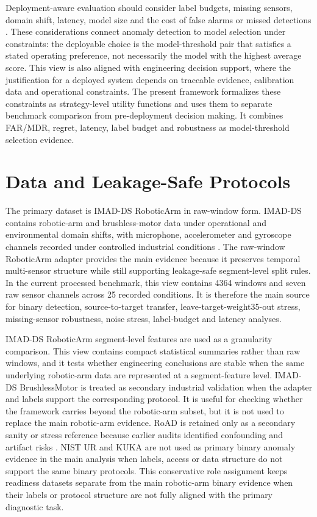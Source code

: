Deployment-aware evaluation should consider label budgets, missing sensors, domain shift, latency, model size and the cost of false alarms or missed detections \cite{Sokolova2009PerformanceMeasures,Elkan2001CostSensitive,Drummond2006CostCurves,Sculley2015TechnicalDebt,Breck2017MLTestScore,Amershi2019SE4ML}. These considerations connect anomaly detection to model selection under constraints: the deployable choice is the model-threshold pair that satisfies a stated operating preference, not necessarily the model with the highest average score. This view is also aligned with engineering decision support, where the justification for a deployed system depends on traceable evidence, calibration data and operational constraints. The present framework formalizes these constraints as strategy-level utility functions and uses them to separate benchmark comparison from pre-deployment decision making. It combines FAR/MDR, regret, latency, label budget and robustness as model-threshold selection evidence.



\section{Data and Leakage-Safe Protocols}



The primary dataset is IMAD-DS RoboticArm in raw-window form. IMAD-DS contains robotic-arm and brushless-motor data under operational and environmental domain shifts, with microphone, accelerometer and gyroscope channels recorded under controlled industrial conditions \cite{Augusti2024IMADDS}. The raw-window RoboticArm adapter provides the main evidence because it preserves temporal multi-sensor structure while still supporting leakage-safe segment-level split rules. In the current processed benchmark, this view contains 4364 windows and seven raw sensor channels across 25 recorded conditions. It is therefore the main source for binary detection, source-to-target transfer, leave-target-weight35-out stress, missing-sensor robustness, noise stress, label-budget and latency analyses.

IMAD-DS RoboticArm segment-level features are used as a granularity comparison. This view contains compact statistical summaries rather than raw windows, and it tests whether engineering conclusions are stable when the same underlying robotic-arm data are represented at a segment-feature level. IMAD-DS BrushlessMotor is treated as secondary industrial validation when the adapter and labels support the corresponding protocol. It is useful for checking whether the framework carries beyond the robotic-arm subset, but it is not used to replace the main robotic-arm evidence. RoAD is retained only as a secondary sanity or stress reference because earlier audits identified confounding and artifact risks \cite{Gaiardelli2023RoAD}. NIST UR and KUKA are not used as primary binary anomaly evidence in the main analysis when labels, access or data structure do not support the same binary protocols. This conservative role assignment keeps readiness datasets separate from the main robotic-arm binary evidence when their labels or protocol structure are not fully aligned with the primary diagnostic task.

